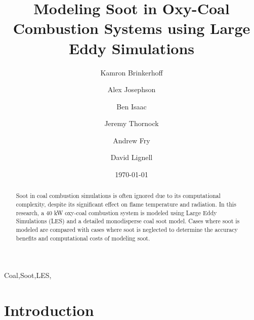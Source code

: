 \documentclass[review,3p]{elsarticle}
\begin{document}


\title{Modeling Soot in Oxy-Coal Combustion Systems using Large Eddy Simulations}

\author[byu]{Kamron Brinkerhoff}
\author[lanl]{Alex Josephson}
\author[llnl]{Ben Isaac}
\author[uofu]{Jeremy Thornock}
\author[byu]{Andrew Fry}
\author[byu,*]{David Lignell}

\address[byu]{350 CB, Brigham Young University, Provo, UT 84602, USA}
\address[lanl]{350 CB, Brigham Young University, Provo, UT 84602, USA}
\address[llnl]{350 CB, Brigham Young University, Provo, UT 84602, USA}
\address[uofu]{350 CB, Brigham Young University, Provo, UT 84602, USA}


\date{\today}


\begin{abstract}

Soot in coal combustion simulations is often ignored due to its computational complexity, despite its significant effect on flame temperature and radiation.  In this research, a 40 kW oxy-coal combustion system is modeled using Large Eddy Simulations (LES) and a detailed monodisperse coal soot model. Cases where soot is modeled are compared with cases where soot is neglected to determine the accuracy benefits and computational costs of modeling soot.

\end{abstract}

\begin{keyword} 
Coal\sep Soot\sep LES\sep 
\end{keyword}


\maketitle     


\linenumbers

\section{Introduction}
\end{document}

